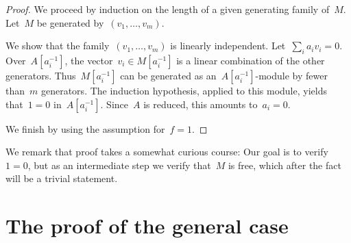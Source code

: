 \documentclass{amsart}
\theoremstyle{definition}
\theoremstyle{plain}
\theoremstyle{remark}
\begin{document}
\begin{proof}We proceed by induction on the length of a given generating family
of~$M$. Let~$M$ be generated by~$(v_1,\ldots,v_m)$.

We show that the family~$(v_1,\ldots,v_m)$ is linearly independent. Let~$\sum_i
a_i v_i = 0$. Over~$A[a_i^{-1}]$, the vector~$v_i \in M[a_i^{-1}]$ is a linear
combination of the other generators. Thus~$M[a_i^{-1}]$ can be generated as
an~$A[a_i^{-1}]$-module by fewer than~$m$ generators. The induction hypothesis,
applied to this module, yields that~$1 = 0$ in~$A[a_i^{-1}]$. Since~$A$ is
reduced, this amounts to~$a_i = 0$.

We finish by using the assumption for~$f = 1$.
\end{proof}

We remark that proof takes a somewhat curious course: Our goal is to
verify~$1 = 0$, but as an intermediate step we verify that~$M$ is free, which
after the fact will be a trivial statement.


\section{The proof of the general case}
\end{document}
